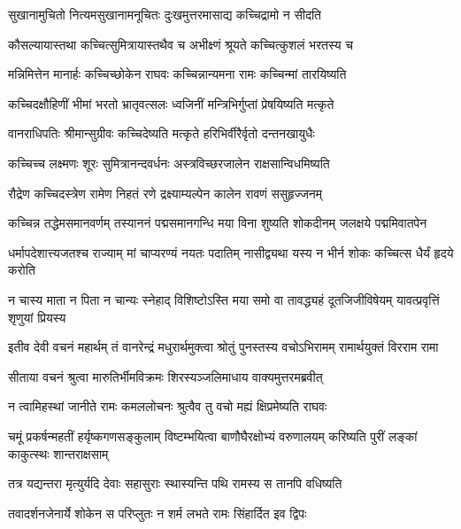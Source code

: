 \twolineshloka
{सुखानामुचितो नित्यमसुखानामनूचितः}
{दुःखमुत्तरमासाद्य कच्चिद्रामो न सीदति} %

\twolineshloka
{कौसल्यायास्तथा कच्चित्सुमित्रायास्तथैव च}
{अभीक्ष्णं श्रूयते कच्चित्कुशलं भरतस्य च} %

\twolineshloka
{मन्निमित्तेन मानार्हः कच्चिच्छोकेन राघवः}
{कच्चिन्नान्यमना रामः कच्चिन्मां तारयिष्यति} %

\twolineshloka
{कच्चिदक्षौहिणीं भीमां भरतो भ्रातृवत्सलः}
{ध्वजिनीं मन्त्रिभिर्गुप्तां प्रेषयिष्यति मत्कृते} %

\twolineshloka
{वानराधिपतिः श्रीमान्सुग्रीवः कच्चिदेष्यति}
{मत्कृते हरिभिर्वीरैर्वृतो दन्तनखायुधैः} %

\twolineshloka
{कच्चिच्च लक्ष्मणः शूरः सुमित्रानन्दवर्धनः}
{अस्त्रविच्छरजालेन राक्षसान्विधमिष्यति} %

\twolineshloka
{रौद्रेण कच्चिदस्त्रेण रामेण निहतं रणे}
{द्रक्ष्याम्यल्पेन कालेन रावणं ससुहृज्जनम्} %

\fourlineindentedshloka
{कच्चिन्न तद्धेमसमानवर्णम्}
{तस्याननं पद्मसमानगन्धि}
{मया विना शुष्यति शोकदीनम्}
{जलक्षये पद्ममिवातपेन} %

\fourlineindentedshloka
{धर्मापदेशात्त्यजतश्च राज्याम्}
{मां चाप्यरण्यं नयतः पदातिम्}
{नासीद्व्यथा यस्य न भीर्न शोकः}
{कच्चित्स धैर्यं हृदये करोति} %

\fourlineindentedshloka
{न चास्य माता न पिता न चान्यः}
{स्नेहाद् विशिष्टोऽस्ति मया समो वा}
{तावद्ध्यहं दूतजिजीविषेयम्}
{यावत्प्रवृत्तिं शृणुयां प्रियस्य} %

\fourlineindentedshloka
{इतीव देवी वचनं महार्थम्}
{तं वानरेन्द्रं मधुरार्थमुक्त्वा}
{श्रोतुं पुनस्तस्य वचोऽभिरामम्}
{रामार्थयुक्तं विरराम रामा} %

\twolineshloka
{सीताया वचनं श्रुत्वा मारुतिर्भीमविक्रमः}
{शिरस्यञ्जलिमाधाय वाक्यमुत्तरमब्रवीत्} %

\twolineshloka
{न त्वामिहस्थां जानीते रामः कमललोचनः}
{श्रुत्वैव तु वचो मह्यं क्षिप्रमेष्यति राघवः} %

\threelineshloka
{चमूं प्रकर्षन्महतीं हर्यृष्कगणसङ्कुलाम्}
{विष्टम्भयित्वा बाणौघैरक्षोभ्यं वरुणालयम्}
{करिष्यति पुरीं लङ्कां काकुत्स्थः शान्तराक्षसाम्} %

\twolineshloka
{तत्र यद्यन्तरा मृत्युर्यदि देवाः सहासुराः}
{स्थास्यन्ति पथि रामस्य स तानपि वधिष्यति} %

\twolineshloka
{तवादर्शनजेनार्ये शोकेन स परिप्लुतः}
{न शर्म लभते रामः सिंहार्दित इव द्विपः} %


